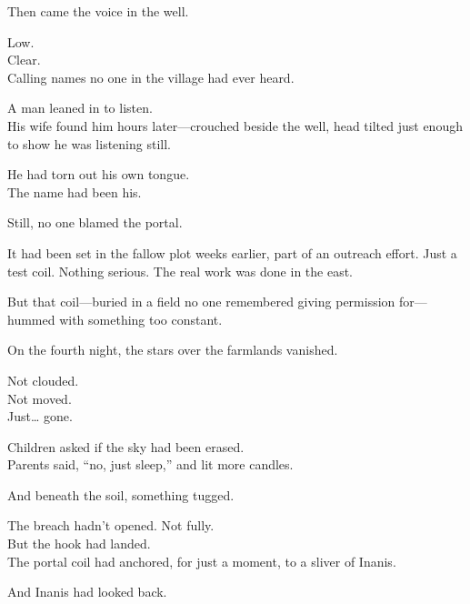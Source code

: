 \documentclass[9pt]{article}
\begin{document}
\vspace{0.5em}
Then came the voice in the well.

\vspace{0.5em}
Low.\\
Clear.\\
Calling names no one in the village had ever heard.

\vspace{0.5em}
A man leaned in to listen.\\
His wife found him hours later---crouched beside the well, head tilted just enough to show he was listening still.

\vspace{0.5em}
He had torn out his own tongue.\\
The name had been his.

\vspace{0.5em}
Still, no one blamed the portal.

\vspace{0.5em}
It had been set in the fallow plot weeks earlier, part of an outreach effort. Just a test coil. Nothing serious. The real work was done in the east.

\vspace{0.5em}
But that coil---buried in a field no one remembered giving permission for---hummed with something too constant.

\vspace{0.5em}
On the fourth night, the stars over the farmlands vanished.

\vspace{0.5em}
Not clouded.\\
Not moved.\\
Just\ldots{} gone.

\vspace{0.5em}
Children asked if the sky had been erased.\\
Parents said, ``no, just sleep,'' and lit more candles.

\vspace{0.5em}
And beneath the soil, something tugged.

\vspace{0.5em}
The breach hadn’t opened. Not fully.\\
But the hook had landed.\\
The portal coil had anchored, for just a moment, to a sliver of Inanis.

\vspace{0.5em}
And Inanis had looked back.
\end{document}
